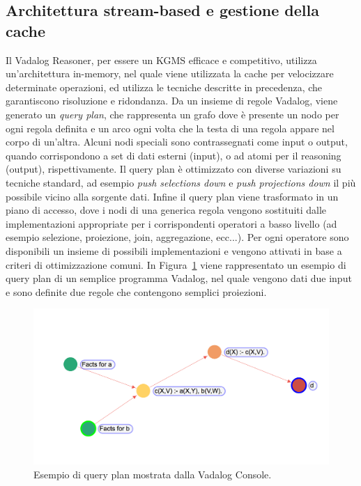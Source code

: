 \subsection{Architettura stream-based e gestione della cache}

Il Vadalog Reasoner, per essere un KGMS efficace e competitivo, utilizza un'architettura in-memory, nel quale viene utilizzata la cache per velocizzare determinate operazioni, ed utilizza le tecniche descritte in precedenza, che garantiscono risoluzione e ridondanza. \newline
Da un insieme di regole Vadalog, viene generato un \textit{query plan}, che rappresenta un grafo dove è presente un nodo per ogni regola definita e un arco ogni volta che la testa di una regola appare nel corpo di un'altra. \newline
Alcuni nodi speciali sono contrassegnati come input o output, quando corrispondono a set di dati esterni (input), o ad atomi per il reasoning (output), rispettivamente.
Il query plan è ottimizzato con diverse variazioni su tecniche standard, ad esempio \textit{push selections down} e \textit{push projections down} il più possibile vicino alla sorgente dati. \newline
Infine il query plan viene trasformato in un piano di accesso, dove i nodi di una generica regola vengono sostituiti dalle implementazioni appropriate per i corrispondenti operatori a basso livello (ad esempio selezione, proiezione, join, aggregazione, ecc...). \newline
Per ogni operatore sono disponibili un insieme di possibili implementazioni e vengono attivati in base a criteri di ottimizzazione comuni. \newline
In Figura~\ref{fig:query_plan_1} viene rappresentato un esempio di query plan di un semplice programma Vadalog, nel quale vengono dati due input e sono definite due regole che contengono semplici proiezioni. 
\begin{figure}[h!]
	\centering
	\includegraphics[width=0.8\linewidth]{figure/query-plan-ex1}
	\caption{Esempio di query plan mostrata dalla Vadalog Console.}
	\label{fig:query_plan_1}
\end{figure}


